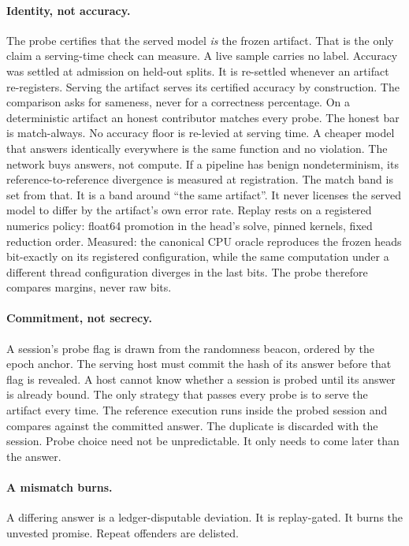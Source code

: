 \documentclass[11pt]{article}
\begin{document}
\paragraph{Identity, not accuracy.} The probe certifies that
the served model \emph{is} the frozen artifact. That is the only
claim a serving-time check can measure. A live sample carries no
label. Accuracy was settled at admission on held-out splits. It
is re-settled whenever an artifact re-registers. Serving the
artifact serves its certified accuracy by construction. The
comparison asks for sameness, never for a correctness percentage.
On a deterministic artifact an honest contributor matches every
probe. The honest bar is match-always. No accuracy floor is
re-levied at serving time. A cheaper model that answers
identically everywhere is the same function and no violation.
The network buys answers, not compute. If a pipeline has benign
nondeterminism, its reference-to-reference divergence is measured
at registration. The match band is set from that. It is a band
around ``the same artifact''. It never licenses the served model
to differ by the artifact's own error rate. Replay rests on a
registered numerics policy: float64 promotion in the head's
solve, pinned kernels, fixed reduction order. Measured: the
canonical CPU oracle reproduces the frozen heads bit-exactly on
its registered configuration, while the same computation under a
different thread configuration diverges in the last bits. The
probe therefore compares margins, never raw bits.

\paragraph{Commitment, not secrecy.} A session's probe flag is
drawn from the randomness beacon, ordered by the epoch anchor.
The serving host must commit the
hash of its answer before that flag is revealed. A host cannot
know whether a session is probed until its answer is already
bound. The only strategy that passes every probe is to serve the
artifact every time. The reference execution runs inside the
probed session and compares against the committed answer. The
duplicate is discarded with the session. Probe choice need not be
unpredictable. It only needs to come later than the answer.

\paragraph{A mismatch burns.} A differing answer is a
ledger-disputable deviation. It is replay-gated. It burns the
unvested promise. Repeat offenders are delisted.
\end{document}
